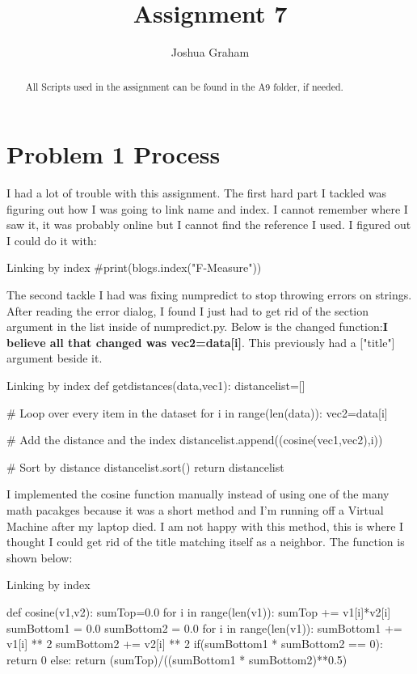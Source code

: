 \documentclass[11pt]{report}
\begin{document}
\title{Assignment 7}
\author{Joshua Graham}

\maketitle
\pagebreak
\begin{abstract}
All Scripts used in the assignment can be found in the A9 folder, if needed.

\end{abstract}
\section{Problem 1 Process}
	I had a lot of trouble with this assignment. The first hard part I tackled was figuring out how I was going to link name and index. I cannot remember where I saw it, it was probably online but I cannot find the reference I used. I figured out I could do it with:
\begin{mylisting}{Linking by index}
#print(blogs.index("F-Measure"))
\end{mylisting}

The second tackle I had was fixing numpredict to stop throwing errors on strings. After reading the error dialog, I found I just had to get rid of the section argument in the list inside of numpredict.py. Below is the changed function:\textbf{I believe all that changed was vec2=data[i]}. This previously had a ["title"] argument beside it.
\begin{mylisting}{Linking by index}
def getdistances(data,vec1):
  distancelist=[]

  # Loop over every item in the dataset
  for i in range(len(data)):
    vec2=data[i]

    # Add the distance and the index
    distancelist.append((cosine(vec1,vec2),i))

  # Sort by distance
  distancelist.sort()
  return distancelist

\end{mylisting}

I implemented the cosine function manually instead of using one of the many math pacakges because it was a short method and I'm running off a Virtual Machine after my laptop died. I am not happy with this method, this is where I thought I could get rid of the title matching itself as a neighbor.  The function is shown below:
\begin{mylisting}{Linking by index}

def cosine(v1,v2):
    sumTop=0.0
    for i in range(len(v1)):
        sumTop += v1[i]*v2[i]
    sumBottom1 = 0.0
    sumBottom2 = 0.0
    for i in range(len(v1)):
        sumBottom1 += v1[i] ** 2
        sumBottom2 += v2[i] ** 2
    if(sumBottom1 * sumBottom2 == 0):
        return 0
    else:
        return (sumTop)/((sumBottom1 * sumBottom2)**0.5)
\end{mylisting}
\end{document}
